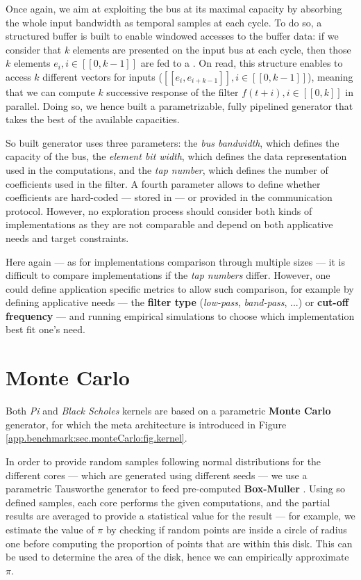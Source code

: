         Once again, we aim at exploiting the  bus at its maximal capacity by absorbing the whole input bandwidth as temporal samples at each cycle.
        To do so, a structured buffer is built to enable windowed accesses to the buffer data: if we consider that $k$ elements are presented on the input bus at each cycle, then those $k$ elements $e_i, i \in [\![0, k-1]\!]$ are fed to a . 
        On read, this structure enables to access $k$ different vectors for inputs ($[\![e_{i}, e_{i+k-1}]\!], i \in [\![0, k-1]\!]$), meaning that we can compute $k$ successive response of the filter $f(t+i), i\in[\![0, k]\!]$ in parallel.
        Doing so, we hence built a parametrizable, fully pipelined  generator that takes the best of the available  capacities.

        So built  generator uses three parameters: the {\it bus bandwidth}, which defines the capacity of the  bus, the {\it element bit width}, which defines the data representation used in the computations, and the {\it tap number}, which defines the number of coefficients used in the filter.
        A fourth parameter allows to define whether coefficients are hard-coded --- \ie stored in  --- or provided in the communication protocol. However, no exploration process should consider both kinds of implementations as they are not comparable and depend on both applicative needs and target constraints.

        Here again --- as for  implementations comparison through multiple sizes --- it is difficult to compare  implementations if the {\it tap numbers} differ.
        However, one could define application specific metrics to allow such comparison, for example by defining applicative needs --- \eg the {\bf filter type} ({\it low-pass}, {\it band-pass}, ...) or {\bf cut-off frequency} --- and running empirical simulations to choose which implementation best fit one's need.
        
    \clearpage
    \section*{Monte Carlo}
        Both {\it Pi} and {\it Black Scholes} kernels are based on a parametric {\bf Monte Carlo} generator, for which the meta architecture is introduced in Figure \ref{app.benchmark:sec.monteCarlo:fig.kernel}.

        In order to provide random samples following normal distributions for the different cores --- which are generated using different seeds --- we use a parametric Tausworthe generator to feed pre-computed {\bf Box-Muller}  \cite{box1958note}.
        Using so defined samples, each core performs the given computations, and the partial results are averaged to provide a statistical value for the result --- for example, we estimate the value of $\pi$ by checking if random points are inside a circle of radius one before computing the proportion of points that are within this disk.
        This can be used to determine the area of the disk, hence we can empirically approximate $\pi$.

